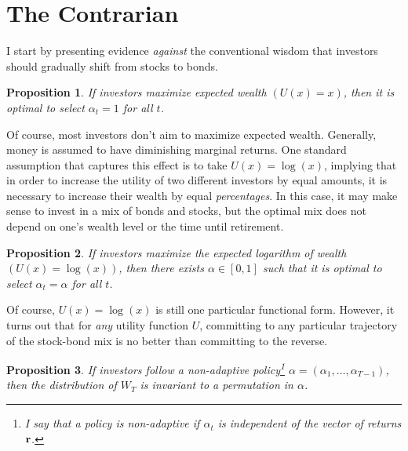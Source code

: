 \documentclass[11pt, oneside]{article}   	%
\newtheorem{proposition}{Proposition}
\begin{document}
\section{The Contrarian}

I start by presenting evidence {\em against} the conventional wisdom that investors should gradually shift from stocks to bonds. 

\begin{proposition}
If investors maximize expected wealth $(U(x) = x)$, then it is optimal to select $\alpha_t = 1$ for all $t$.
\end{proposition}

Of course, most investors don't aim to maximize expected wealth. Generally, money is assumed to have diminishing marginal returns. One standard assumption that captures this effect is to take $U(x) = \log(x)$, implying that in order to increase the utility of two different investors by equal amounts, it is necessary to increase their wealth by equal {\em percentages}. In this case, it may make sense to invest in a mix of bonds and stocks, but the optimal mix does not depend on one's wealth level or the time until retirement.


\begin{proposition}
If investors maximize the expected logarithm of wealth $(U(x) = \log(x))$, then there exists $\alpha \in [0,1]$ such that it is optimal to select $\alpha_t = \alpha$ for all $t$. 
\end{proposition}


Of course, $U(x) = \log(x)$ is still one particular functional form. However, it turns out that for {\em any} utility function $U$, committing to any particular trajectory of the stock-bond mix is no better than committing to the reverse.


\begin{proposition} \label{prop:static}
If investors follow a non-adaptive policy\footnote{I say that a policy is non-adaptive if $\alpha_t$ is independent of the vector of returns ${\bf r}$.} $\alpha = (\alpha_1, \ldots, \alpha_{T-1})$, then the distribution of $W_T$ is invariant to a permutation in $\alpha$.
\end{proposition}
\end{document}
